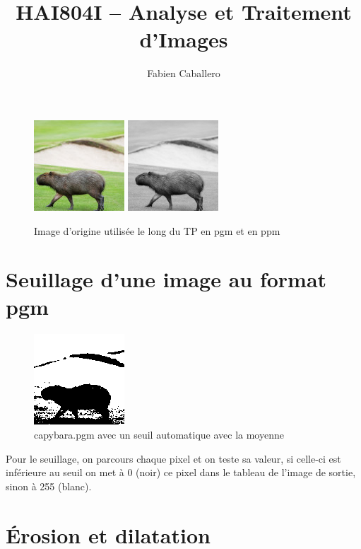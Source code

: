 \documentclass{article}
\title{HAI804I – Analyse et Traitement d'Images}
\author{Fabien Caballero }
\begin{document}
  

\maketitle
    \tableofcontents

\newpage

\begin{figure}[h]
\centerline{\includegraphics[scale=4]{./rendus/capybaral.jpg}  \includegraphics[scale=0.953]{./rendus/capybatap.png}}
\caption{Image d'origine utilisée le long du TP en pgm et en ppm}
\end{figure}

\section{Seuillage d'une image au format pgm}


\begin{figure}[h]
\centerline{\includegraphics[scale=1.4]{./rendus/capybatapSeuil.png}}
\caption{capybara.pgm avec un seuil automatique avec la moyenne}
\end{figure}

Pour le seuillage, on parcours chaque pixel et on teste sa valeur, si celle-ci est inférieure au seuil on met à 0 (noir) ce pixel dans le tableau de l'image de sortie, sinon à 255 (blanc).

\newpage
\section{Érosion et dilatation }
\end{document}

